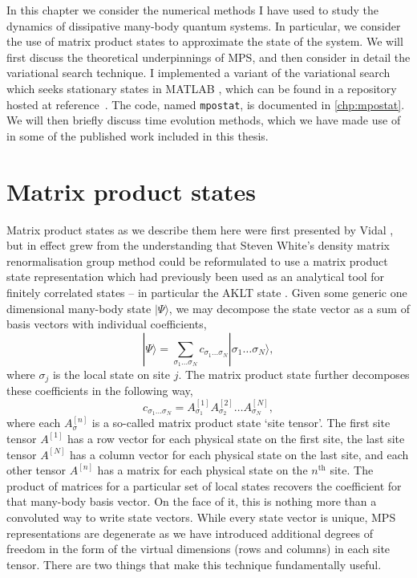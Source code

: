 In this chapter we consider the numerical methods I have used to study the dynamics of dissipative many-body quantum systems. In particular, we consider the use of matrix product states to approximate the state of the system. We will first discuss the theoretical underpinnings of MPS, and then consider in detail the variational search technique. I implemented a variant of the variational search which seeks stationary states in MATLAB \cite{MATLAB}, which can be found in a repository hosted at reference~\cite{otb:gitVSSS}. The code, named \lstinline$mpostat$, is documented in \cref{chp:mpostat}. We will then briefly discuss time evolution methods, which we have made use of in some of the published work included in this thesis.

 \section{Matrix product states}
 Matrix product states as we describe them here were first presented by Vidal \cite{Vidal2004}, but in effect grew from the understanding that Steven White's density matrix renormalisation group method \cite{White1992,White1993} could be reformulated to use a matrix product state representation which had previously been used as an analytical tool for finitely correlated states -- in particular the AKLT state \cite{Affleck1987}.
 Given some generic one dimensional many-body state \(|\Psi \rangle\), we may decompose the state vector as a sum of basis vectors with individual coefficients,
 \begin{equation}
 	|\Psi \rangle = \sum_{\sigma_{1} \ldots \sigma_{N}} c_{\sigma_{1} \ldots \sigma_{N}}| \sigma_{1} \ldots \sigma_{N} \rangle,
 	\label{eq:mps1-1}
 \end{equation}
 where \(\sigma_{j}\) is the local state on site \(j\). The matrix product state further decomposes these coefficients in the following way,
 \begin{equation}
 	c_{\sigma_{1} \ldots \sigma_{N}} = A^{[1]}_{\sigma_{1}} A^{[2]}_{\sigma_{2}} \ldots A^{[N]}_{\sigma_{N}},
 	\label{eq:mps1-2}
 \end{equation}
 where each \(A^{[n]}_{\sigma}\) is a so-called matrix product state `site tensor'. The first site tensor \(A^{[1]}\) has a row vector for each physical state on the first site, the last site tensor \(A^{[N]}\) has a column vector for each physical state on the last site, and each other tensor \(A^{[n]}\) has a matrix for each physical state on the \(n^{\mathrm{th}}\) site. The product of matrices for a particular set of local states recovers the coefficient for that many-body basis vector. On the face of it, this is nothing more than a convoluted way to write state vectors. While every state vector is unique, MPS representations are degenerate as we have introduced additional degrees of freedom in the form of the virtual dimensions (rows and columns) in each site tensor. There are two things that make this technique fundamentally useful.

